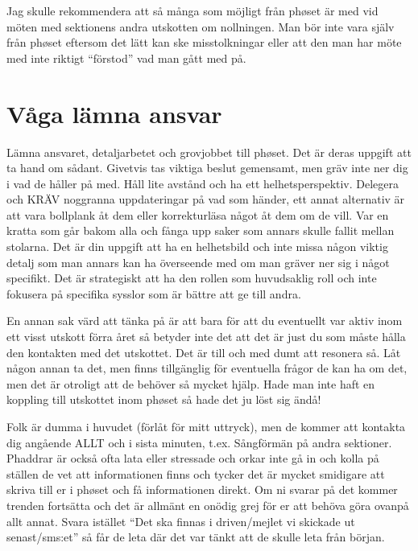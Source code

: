 \documentclass[10pt]{article}
\begin{document}
    Jag skulle rekommendera att så många som möjligt från phøset är med vid möten med sektionens andra utskotten om nollningen. Man bör inte vara själv från phøset eftersom det lätt kan ske misstolkningar eller att den man har möte med inte riktigt “förstod” vad man gått med på.

    \section{Våga lämna ansvar}
    Lämna ansvaret, detaljarbetet och grovjobbet till phøset. Det är deras uppgift att ta hand om sådant. Givetvis tas viktiga beslut gemensamt, men gräv inte ner dig i vad de håller på med. Håll lite avstånd och ha ett helhetsperspektiv. Delegera och KRÄV noggranna uppdateringar på vad som händer, ett annat alternativ är att vara bollplank åt dem eller korrekturläsa något åt dem om de vill. Var en kratta som går bakom alla och fånga upp saker som annars skulle fallit mellan stolarna. Det är din uppgift att ha en helhetsbild och inte missa någon viktig detalj som man annars kan ha överseende med om man gräver ner sig i något specifikt. Det är strategiskt att ha den rollen som huvudsaklig roll och inte fokusera på specifika sysslor som är bättre att ge till andra.

    En annan sak värd att tänka på är att bara för att du eventuellt var aktiv inom ett visst utskott förra året så betyder inte det att det är just du som måste hålla den kontakten med det utskottet. Det är till och med dumt att resonera så. Låt någon annan ta det, men finns tillgänglig för eventuella frågor de kan ha om det, men det är otroligt att de behöver så mycket hjälp. Hade man inte haft en koppling till utskottet inom phøset så hade det ju löst sig ändå!

    Folk är dumma i huvudet (förlåt för mitt uttryck), men de kommer att kontakta dig angående ALLT och i sista minuten, t.ex. Sångförmän på andra sektioner. Phaddrar är också ofta lata eller stressade och orkar inte gå in och kolla på ställen de vet att informationen finns och tycker det är mycket smidigare att skriva till er i phøset och få informationen direkt. Om ni svarar på det kommer trenden fortsätta och det är allmänt en onödig grej för er att behöva göra ovanpå allt annat. Svara istället ``Det ska finnas i driven/mejlet vi skickade ut senast/sms:et'' så får de leta där det var tänkt att de skulle leta från början.
\end{document}
